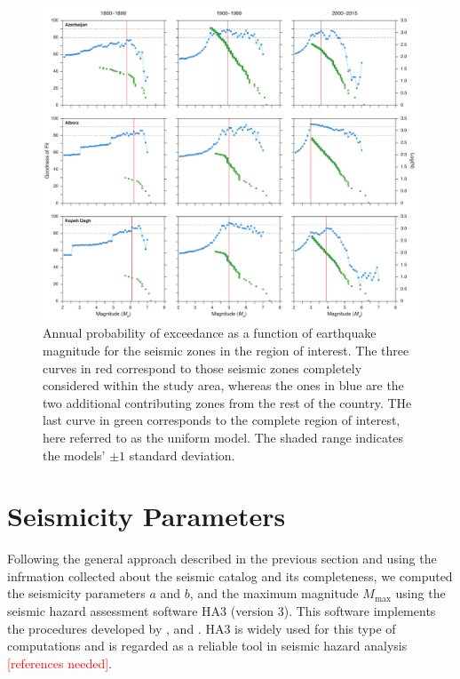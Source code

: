 \begin{figure}[t]
    \centering
    \includegraphics[width=\textwidth]{figures/pdf/figure-06} 
    \caption{Annual probability of exceedance as a function of earthquake magnitude for the seismic zones in the region of interest. The three curves in red correspond to those seismic zones completely considered within the study area, whereas the ones in blue are the two additional contributing zones from the rest of the country. THe last curve in green corresponds to the complete region of interest, here referred to as the uniform model. The shaded range indicates the models' $\pm 1$ standard deviation.}
    \label{fig:annualp}
\end{figure}

\section{Seismicity Parameters}

Following the general approach described in the previous section and using the infrmation collected about the seismic catalog and its completeness, we computed the seismicity parameters $a$ and $b$, and the maximum magnitude $M_{\max}$ using the seismic hazard assessment software HA3 (version 3). This software implements the procedures developed by \citet{Kijko_1989_BSSA, Kijko_1992_BSSA}, and \citet{Kijko_2004_PAG}. HA3 is widely used for this type of computations and is regarded as a reliable tool in seismic hazard analysis \citep[see, for instance,][]{}\textcolor{red}{[references needed]}.

